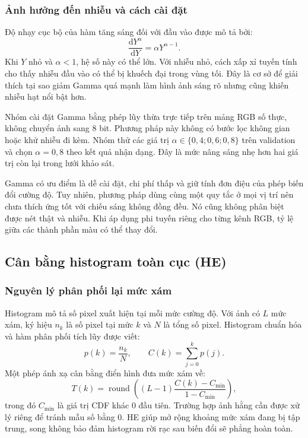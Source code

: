 \subsubsection{Ảnh hưởng đến nhiễu và cách cài đặt}
Độ nhạy cục bộ của hàm tăng sáng đối với đầu vào được mô tả bởi:
\begin{equation}
\frac{\mathrm{d}Y^\alpha}{\mathrm{d}Y}=\alpha Y^{\alpha-1}.
\end{equation}
Khi $Y$ nhỏ và $\alpha<1$, hệ số này có thể lớn. Với nhiễu nhỏ, cách xấp xỉ tuyến tính cho thấy nhiễu đầu vào có thể bị khuếch đại trong vùng tối. Đây là cơ sở để giải thích tại sao giảm Gamma quá mạnh làm hình ảnh sáng rõ nhưng cũng khiến nhiễu hạt nổi bật hơn.

Nhóm cài đặt Gamma bằng phép lũy thừa trực tiếp trên mảng RGB số thực, không chuyển ảnh sang 8 bit. Phương pháp này không có bước lọc không gian hoặc khử nhiễu đi kèm. Nhóm thử các giá trị $\alpha\in\{0,4;0,6;0,8\}$ trên validation và chọn $\alpha=0,8$ theo kết quả nhận dạng. Đây là mức nâng sáng nhẹ hơn hai giá trị còn lại trong lưới khảo sát.

Gamma có ưu điểm là dễ cài đặt, chi phí thấp và giữ tính đơn điệu của phép biến đổi cường độ. Tuy nhiên, phương pháp dùng cùng một quy tắc ở mọi vị trí nên chưa thích ứng tốt với chiếu sáng không đồng đều. Nó cũng không phân biệt được nét thật và nhiễu. Khi áp dụng phi tuyến riêng cho từng kênh RGB, tỷ lệ giữa các thành phần màu có thể thay đổi.

\subsection{Cân bằng histogram toàn cục (HE)}
\subsubsection{Nguyên lý phân phối lại mức xám}
Histogram mô tả số pixel xuất hiện tại mỗi mức cường độ. Với ảnh có $L$ mức xám, ký hiệu $n_k$ là số pixel tại mức $k$ và $N$ là tổng số pixel. Histogram chuẩn hóa và hàm phân phối tích lũy được viết:
\begin{equation}
p(k)=\frac{n_k}{N},\qquad C(k)=\sum_{j=0}^{k}p(j).
\end{equation}
Một phép ánh xạ cân bằng điển hình đưa mức xám về:
\begin{equation}
T(k)=\operatorname{round}\!\left((L-1)\frac{C(k)-C_{\min}}{1-C_{\min}}\right),
\label{eq:he}
\end{equation}
trong đó $C_{\min}$ là giá trị CDF khác 0 đầu tiên. Trường hợp ảnh hằng cần được xử lý riêng để tránh mẫu số bằng 0. HE giúp mở rộng khoảng mức xám đang bị tập trung, song không bảo đảm histogram rời rạc sau biến đổi sẽ phẳng hoàn toàn.

